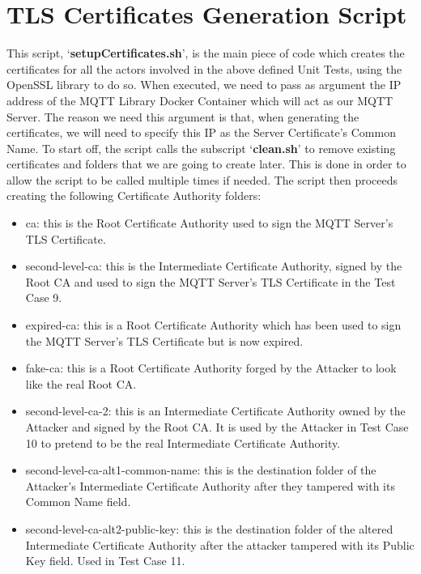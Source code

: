 \documentclass[binding=0.6cm,noexaminfo]{sapthesis}
\begin{document}
\section{TLS Certificates Generation Script}

This script, `\textbf{setupCertificates.sh}', is the main piece of code which creates the certificates for all the actors involved in the above defined Unit Tests, using the OpenSSL library to do so. When executed, we need to pass as argument the IP address of the  MQTT Library Docker Container which will act as our MQTT Server. The reason we need this argument is that, when generating the certificates, we will need to specify this IP as the Server Certificate’s Common Name.
To start off, the script calls the subscript `\textbf{clean.sh}' to remove existing certificates and folders that we are going to create later. This is done in order to allow the script to be called multiple times if needed. The script then proceeds creating the following Certificate Authority folders:
\begin{itemize}
	\item ca: this is the Root Certificate Authority used to sign the MQTT Server’s TLS Certificate.
	\item second-level-ca: this is the Intermediate Certificate Authority, signed by the  Root CA and used to sign the MQTT Server’s TLS Certificate in the Test Case 9.
	\item expired-ca: this is a Root Certificate Authority which has been used to sign the MQTT Server’s TLS Certificate but is now expired.
	\item fake-ca: this is a Root Certificate Authority forged by the Attacker to look like the real Root CA.
	\item second-level-ca-2: this is an Intermediate Certificate Authority owned by the Attacker and signed by the Root CA. It is used by the Attacker in Test Case 10  to pretend to be the real Intermediate Certificate Authority.
	\item second-level-ca-alt1-common-name: this is the destination folder of the Attacker’s Intermediate Certificate Authority after they tampered with its Common Name field.
	\item second-level-ca-alt2-public-key: this is the destination folder of the altered  Intermediate Certificate Authority after the attacker tampered with its Public Key field. Used in Test Case 11.
\end{itemize}
\end{document}
